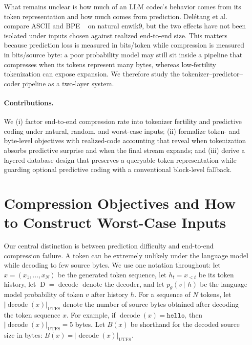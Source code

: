 \documentclass{article}
\newcommand{\bytes}[1]{\lvert #1\rvert_{\mathrm{UTF8}}}
\newcommand{\Dec}{\operatorname{D}}
\begin{document}
What remains unclear is how much of an LLM codec's behavior comes from its token
representation and how much comes from prediction. Delétang et al. compare ASCII
and BPE ~\citep{sennrich2016bpe} on natural enwik9, but the two effects have not
been isolated under inputs chosen against realized end-to-end size. This matters
because prediction loss is measured in bits/token while compression is measured in
bits/source byte: a poor probability model may still sit inside a pipeline that
compresses when its tokens represent many bytes, whereas low-fertility tokenization
can expose expansion. We therefore study the tokenizer--predictor--coder pipeline
as a two-layer system.

\paragraph{Contributions.}

We (i) factor end-to-end compression rate into tokenizer fertility and
predictive coding under natural, random, and worst-case inputs; (ii) formalize
token- and byte-level objectives with realized-code accounting that reveal when tokenization
absorbs predictive surprise and when the final stream expands; and (iii) derive
a layered database design that preserves a queryable token representation while
guarding optional predictive coding with a conventional block-level fallback.



\section{Compression Objectives and How to Construct Worst-Case Inputs}
\label{sec:attacks}

Our central distinction is between prediction difficulty and end-to-end compression failure. A token can be extremely unlikely under the language model while decoding to few source bytes. We use one notation throughout: let $x=(x_1,\ldots,x_N)$ be the generated token sequence, let $h_t=x_{<t}$ be its token history, let $\Dec = \operatorname{decode}$ denote the decoder, and let $p_\theta(v\mid h)$ be the language model probability of token $v$ after history $h$. For a sequence of $N$ tokens, let $\bytes{\operatorname{decode}(x)}$ denote the number of source bytes obtained after decoding the token sequence $x$. For example, if $\operatorname{decode}(x)=\texttt{hello}$, then $\bytes{\operatorname{decode}(x)}=5$ bytes.
Let $B(x)$ be shorthand for the decoded source size in bytes: $B(x) = \bytes{\operatorname{decode}(x)}.$
\end{document}
